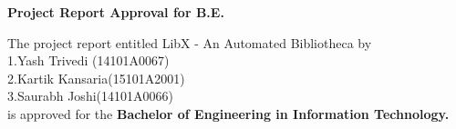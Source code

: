 \documentclass[a4paper,12pt]{report}
\begin{document}
\begin{center}
\vspace*{0.25cm}
    {\centering\onehalfspacing
    {\large\textbf{Project Report Approval for B.E.}}\\
        \vspace{1cm}

        \justify
        The project report entitled LibX - An Automated Bibliotheca by \\
        1.Yash Trivedi (14101A0067)\\
        2.Kartik Kansaria(15101A2001)\\
        3.Saurabh Joshi(14101A0066)\\
        is approved for the \textbf{Bachelor of Engineering in Information Technology.}\\
        \vspace{1cm}

        \hspace{7cm} \\

        \hspace{7cm} \\

        \hspace{7cm} \\
        \flushleft {}\\
        \flushleft {}

    }
\end{center}

\pagebreak
\end{document}

